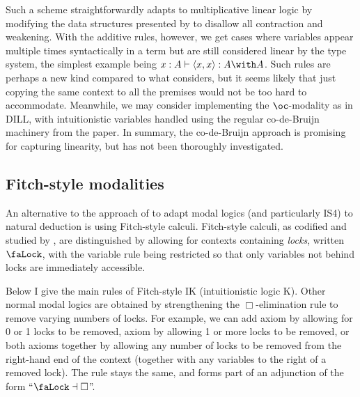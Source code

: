 Such a scheme straightforwardly adapts to multiplicative linear logic by
modifying the data structures presented by \citet{McBride18} to disallow all
contraction and weakening.
With the additive rules, however, we get cases where variables appear multiple
times syntactically in a term but are still considered linear by the type
system, the simplest example being
$x : A \vdash \langle x, x\rangle : A \with A$.
Such rules are perhaps a new kind compared to what \citeauthor{McBride18}
considers, but it seems likely that just copying the same context to all the
premises would not be too hard to accommodate.
Meanwhile, we may consider implementing the $\oc$-modality as in DILL, with
intuitionistic variables handled using the regular co-de-Bruijn machinery from
the paper.
In summary, the co-de-Bruijn approach is promising for capturing linearity, but
has not been thoroughly investigated.

\subsection{Fitch-style modalities}

An alternative to the approach of \citet{judgmental} to adapt modal logics (and
particularly IS4) to natural deduction is using Fitch-style calculi.
Fitch-style calculi, as codified and studied by \citet{Borghuis-thesis}, are
distinguished by allowing for contexts containing \emph{locks}, written $\Lock$,
with the variable rule being restricted so that only variables not behind locks
are immediately accessible.

Below I give the main rules of Fitch-style IK (intuitionistic logic K).
Other normal modal logics are obtained by strengthening the $\Box$-elimination
rule to remove varying numbers of locks.
For example, we can add axiom  by allowing for 0 or 1 locks to be
removed, axiom  by allowing 1 or more locks to be removed, or both
axioms together by allowing any number of locks to be removed from the
right-hand end of the context (together with any variables to the right of a
removed lock).
The  rule stays the same, and forms part of an adjunction of
the form ``$\Lock \dashv \Box$''.


